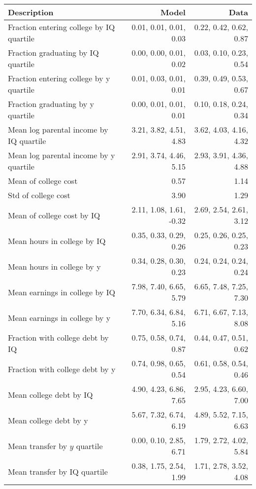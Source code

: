 \begin{tabular}{lrr}
\hline
Description & Model  & Data  \\
\hline
Fraction entering college by IQ quartile & 0.01, 0.01, 0.01, 0.03  & 0.22, 0.42, 0.62, 0.87  \\
Fraction graduating by IQ quartile & 0.00, 0.00, 0.01, 0.02  & 0.03, 0.10, 0.23, 0.54  \\
Fraction entering college by y quartile & 0.01, 0.03, 0.01, 0.01  & 0.39, 0.49, 0.53, 0.67  \\
Fraction graduating by y quartile & 0.00, 0.01, 0.01, 0.01  & 0.10, 0.18, 0.24, 0.34  \\
Mean log parental income by IQ quartile & 3.21, 3.82, 4.51, 4.83  & 3.62, 4.03, 4.16, 4.32  \\
Mean log parental income by y quartile & 2.91, 3.74, 4.46, 5.15  & 2.93, 3.91, 4.36, 4.88  \\
Mean of college cost & 0.57  & 1.14  \\
Std of college cost & 3.90  & 1.29  \\
Mean of college cost by IQ & 2.11, 1.08, 1.61, -0.32  & 2.69, 2.54, 2.61, 3.12  \\
Mean hours in college by IQ & 0.35, 0.33, 0.29, 0.26  & 0.25, 0.26, 0.25, 0.23  \\
Mean hours in college by y & 0.34, 0.28, 0.30, 0.23  & 0.24, 0.24, 0.24, 0.24  \\
Mean earnings in college by IQ & 7.98, 7.40, 6.65, 5.79  & 6.65, 7.48, 7.25, 7.30  \\
Mean earnings in college by y & 7.70, 6.34, 6.84, 5.16  & 6.71, 6.67, 7.13, 8.08  \\
Fraction with college debt by IQ & 0.75, 0.58, 0.74, 0.87  & 0.44, 0.47, 0.51, 0.62  \\
Fraction with college debt by y & 0.74, 0.98, 0.65, 0.54  & 0.61, 0.58, 0.54, 0.46  \\
Mean college debt by IQ & 4.90, 4.23, 6.86, 7.65  & 2.95, 4.23, 6.60, 7.00  \\
Mean college debt by y & 5.67, 7.32, 6.74, 6.19  & 4.89, 5.52, 7.15, 6.63  \\
Mean transfer by $y$ quartile & 0.00, 0.10, 2.85, 6.71  & 1.79, 2.72, 4.02, 5.84  \\
Mean transfer by IQ quartile & 0.38, 1.75, 2.54, 1.99  & 1.71, 2.78, 3.52, 4.08  \\
\hline
\end{tabular}%

